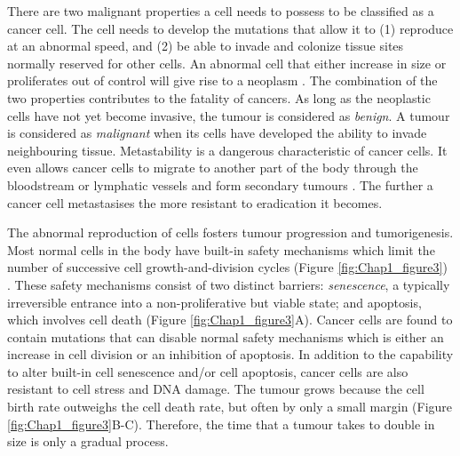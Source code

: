 There are two malignant properties a cell needs to possess to be classified as a cancer cell. The cell needs to develop the mutations that allow it to (1) reproduce at an abnormal speed, and (2) be able to invade and colonize tissue sites normally reserved for other cells. An abnormal cell that either increase in size or proliferates out of control will give rise to a neoplasm \cite{alberts2018molecular, hanahan2000hallmarks}. The combination of the two properties contributes to the fatality of cancers. As long as the neoplastic cells have not yet become invasive, the tumour is considered as \textit{benign}. A tumour is considered as \textit{malignant} when its cells have developed the ability to invade neighbouring tissue. Metastability is a dangerous characteristic of cancer cells. It even allows cancer cells to migrate to another part of the body through the bloodstream or lymphatic vessels and form secondary tumours \cite{alberts2018molecular}. The further a cancer cell metastasises the more resistant to eradication it becomes.   

The abnormal reproduction of cells fosters tumour progression and tumorigenesis. Most normal cells in the body have built-in safety mechanisms which limit the number of successive cell growth-and-division cycles (Figure \ref{fig:Chap1_figure3}) \cite{hanahan2000hallmarks, hanahan2011hallmarksnext}. These safety mechanisms consist of two distinct barriers: \textit{senescence}, a typically irreversible entrance into a non-proliferative but viable state; and apoptosis, which involves cell death (Figure \ref{fig:Chap1_figure3}A). Cancer cells are found to contain mutations that can disable normal safety mechanisms which is either an increase in cell division or an inhibition of apoptosis. In addition to the capability to alter built-in cell senescence and/or cell apoptosis, cancer cells are also resistant to cell stress and DNA damage. The tumour grows because the cell birth rate outweighs the cell death rate, but often by only a small margin (Figure \ref{fig:Chap1_figure3}B-C). Therefore, the time that a tumour takes to double in size is only a gradual process.

